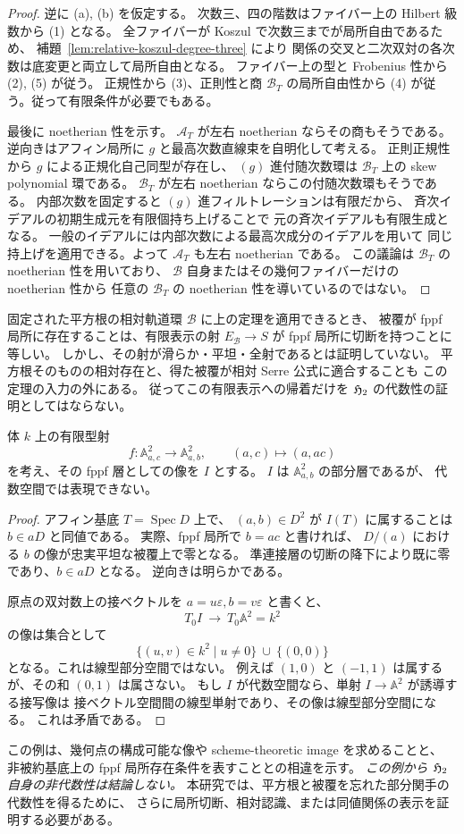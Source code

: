 \begin{proof}
逆に (a), (b) を仮定する。
次数三、四の階数はファイバー上の Hilbert 級数から (1) となる。
全ファイバーが Koszul で次数三までが局所自由であるため、
補題~\ref{lem:relative-koszul-degree-three} により
関係の交叉と二次双対の各次数は底変更と両立して局所自由となる。
ファイバー上の型と Frobenius 性から (2), (5) が従う。
正規性から (3)、正則性と商 $\mathcal B_T$ の局所自由性から
(4) が従う。従って有限条件が必要でもある。

最後に noetherian 性を示す。
$\mathcal A_T$ が左右 noetherian ならその商もそうである。
逆向きはアフィン局所に $g$ と最高次数直線束を自明化して考える。
正則正規性から $g$ による正規化自己同型が存在し、
$(g)$ 進付随次数環は $\mathcal B_T$ 上の skew polynomial 環である。
$\mathcal B_T$ が左右 noetherian ならこの付随次数環もそうである。
内部次数を固定すると $(g)$ 進フィルトレーションは有限だから、
斉次イデアルの初期生成元を有限個持ち上げることで
元の斉次イデアルも有限生成となる。
一般のイデアルには内部次数による最高次成分のイデアルを用いて
同じ持上げを適用できる。よって $\mathcal A_T$ も左右 noetherian である。
この議論は $\mathcal B_T$ の noetherian 性を用いており、
$\mathcal B$ 自身またはその幾何ファイバーだけの noetherian 性から
任意の $\mathcal B_T$ の noetherian 性を導いているのではない。
\end{proof}

\begin{remark}[相対被覆の存在として残る問題]
固定された平方根の相対軌道環 $\mathcal B$ に上の定理を適用できるとき、
被覆が fppf 局所に存在することは、有限表示の射
$E_{\mathcal B}\to S$ が fppf 局所に切断を持つことに等しい。
しかし、その射が滑らか・平坦・全射であるとは証明していない。
平方根そのものの相対存在と、得た被覆が相対 Serre 公式に適合することも
この定理の入力の外にある。
従ってこの有限表示への帰着だけを $\mathfrak H_2$ の代数性の証明としてはならない。
\end{remark}

\begin{example}
\label{ex:fppf-image-nonalgebraic}
体 $k$ 上の有限型射
\[
 f:\mathbb A^2_{a,c}\longrightarrow\mathbb A^2_{a,b},
 \qquad (a,c)\longmapsto(a,ac)
\]
を考え、その fppf 層としての像を $I$ とする。
$I$ は $\mathbb A^2_{a,b}$ の部分層であるが、
代数空間では表現できない。
\end{example}
\begin{proof}
アフィン基底 $T=\operatorname{Spec}D$ 上で、
$(a,b)\in D^2$ が $I(T)$ に属することは $b\in aD$ と同値である。
実際、fppf 局所で $b=ac$ と書ければ、
$D/(a)$ における $b$ の像が忠実平坦な被覆上で零となる。
準連接層の切断の降下により既に零であり、$b\in aD$ となる。
逆向きは明らかである。

原点の双対数上の接ベクトルを
$a=u\varepsilon,b=v\varepsilon$ と書くと、
\[
 T_0 I\ \longrightarrow\ T_0\mathbb A^2=k^2
\]
の像は集合として
\[
 \{(u,v)\in k^2\mid u\ne0\}\ \cup\ \{(0,0)\}
\]
となる。これは線型部分空間ではない。
例えば $(1,0)$ と $(-1,1)$ は属するが、その和 $(0,1)$ は属さない。
もし $I$ が代数空間なら、単射 $I\to\mathbb A^2$ が誘導する接写像は
接ベクトル空間間の線型単射であり、その像は線型部分空間になる。
これは矛盾である。
\end{proof}

この例は、幾何点の構成可能な像や scheme-theoretic image を求めることと、
非被約基底上の fppf 局所存在条件を表すこととの相違を示す。
\emph{この例から $\mathfrak H_2$ 自身の非代数性は結論しない。}
本研究では、平方根と被覆を忘れた部分関手の代数性を得るために、
さらに局所切断、相対認識、または同値関係の表示を証明する必要がある。
